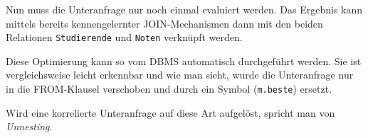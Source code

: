 \begin{enumerate}[a)]
\begin{solution}
Nun muss die Unteranfrage nur noch einmal evaluiert werden.
Das Ergebnis kann mittels bereits kennengelernter JOIN-Mechanismen dann
mit den beiden Relationen \texttt{Studierende} und \texttt{Noten} verknüpft werden.

Diese Optimierung kann so vom DBMS automatisch durchgeführt werden.
Sie ist vergleichsweise leicht erkennbar und wie man sieht, wurde die Unteranfrage
nur in die FROM-Klausel verschoben und durch ein Symbol (\texttt{m.beste}) ersetzt.

Wird eine korrelierte Unteranfrage auf diese Art aufgelöst,
spricht man von \emph{Unnesting}.
\end{solution}

\end{enumerate}
